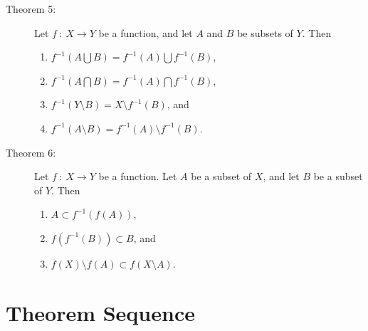 \documentclass{article}
\begin{document}
\begin{description}
  \item[Theorem 5:] Let $f \ : \ X \rightarrow Y$ be a function, and let $A$ and $B$ be subsets of $Y$. Then
    \begin{enumerate}[\hspace{1cm}1.]
      \item $f^{-1}(A \bigcup B) = f^{-1}(A) \bigcup f^{-1}(B)$,
      \item $f^{-1}(A \bigcap B) = f^{-1}(A)\bigcap f^{-1}(B)$,
      \item $f^{-1}(Y \setminus B) = X \setminus f^{-1}(B)$, and
      \item $f^{-1}(A \setminus B) = f^{-1}(A) \setminus f^{-1}(B)$.
    \end{enumerate}

  \item[Theorem 6:] Let $f \ : \ X \rightarrow Y$ be a function. Let $A$ be a subset of $X$, and let $B$ be a subset of $Y$. Then
    \begin{enumerate}[\hspace{1cm}1.]
      \item $A \subset f^{-1}(f(A))$,
      \item $f(f^{-1}(B)) \subset B$, and
      \item $f(X) \setminus f(A) \subset f(X \setminus A)$.
    \end{enumerate}

\end{description}



\section{Theorem Sequence}
\end{document}
